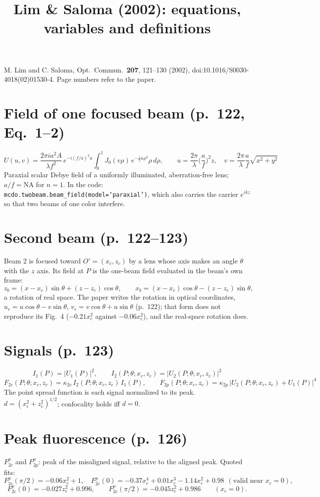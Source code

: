 \documentclass[11pt]{article}
\title{Lim \& Saloma (2002): equations, variables and definitions}
\date{}
\begin{document}
\maketitle\vspace{-3em}
\noindent M. Lim and C. Saloma, Opt.\ Commun.\ \textbf{207}, 121--130 (2002), doi:10.1016/S0030-4018(02)01530-4.
Page numbers refer to the paper.

\section*{Field of one focused beam (p.~122, Eq.~1--2)}
\[
U(u,v)=\frac{2\pi i a^2A}{\lambda f^2}\,e^{-i(f/a)^2u}\int_0^1 J_0(v\rho)\,e^{-\frac{i}{2}u\rho^2}\rho\,d\rho,
\qquad u=\frac{2\pi}{\lambda}\Big(\frac{a}{f}\Big)^2 z,\quad v=\frac{2\pi}{\lambda}\frac{a}{f}\sqrt{x^2+y^2}
\]
Paraxial scalar Debye field of a uniformly illuminated, aberration-free lens; $a/f=\mathrm{NA}$ for $n=1$.
In the code: \texttt{mcdo.twobeam.beam\_field(model='paraxial')}, which also carries the carrier
$e^{ikz}$ so that two beams of one color interfere.

\section*{Second beam (p.~122--123)}
Beam 2 is focused toward $O'=(x_c,z_c)$ by a lens whose axis makes an angle $\theta$ with the $z$ axis.
Its field at $P$ is the one-beam field evaluated in the beam's own frame:
\[
z_b=(x-x_c)\sin\theta+(z-z_c)\cos\theta,\qquad x_b=(x-x_c)\cos\theta-(z-z_c)\sin\theta,
\]
a rotation of real space. The paper writes the rotation in optical coordinates,
$u_r=u\cos\theta-v\sin\theta$, $v_r=v\cos\theta+u\sin\theta$ (p.~122); that form does not reproduce its
Fig.~4 ($-0.21x_c^2$ against $-0.06x_c^2$), and the real-space rotation does.

\section*{Signals (p.~123)}
\[
I_1(P)=|U_1(P)|^2,\qquad I_2(P;\theta;x_c,z_c)=|U_2(P;\theta;x_c,z_c)|^2
\]
\[
F_{2c}(P;\theta;x_c,z_c)=\kappa_{2c}\,I_2(P;\theta;x_c,z_c)\,I_1(P),\qquad
F_{2p}(P;\theta;x_c,z_c)=\kappa_{2p}\,|U_2(P;\theta;x_c,z_c)+U_1(P)|^4
\]
The point spread function is each signal normalized to its peak. $d=(x_c^2+z_c^2)^{1/2}$; confocality holds iff $d=0$.

\section*{Peak fluorescence (p.~126)}
$F^{p}_{2c}$ and $F^{p}_{2p}$: peak of the misaligned signal, relative to the aligned peak. Quoted fits:
\[
F^p_{2c}(\pi/2)=-0.06x_c^2+1,\quad
F^p_{2c}(0)=-0.37x_c^4+0.01x_c^3-1.14x_c^2+0.98\ \ (\text{valid near }x_c=0),
\]
\[
F^p_{2c}(0)=-0.027z_c^2+0.996,\qquad F^p_{2c}(\pi/2)=-0.045z_c^2+0.986\qquad(x_c=0).
\]
\end{document}
